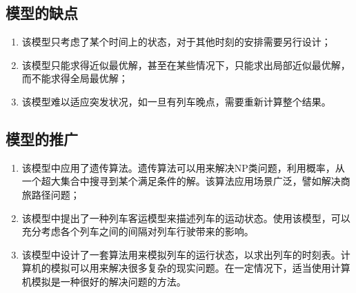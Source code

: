 \subsection{模型的缺点}

\begin{enumerate}
    \item 该模型只考虑了某个时间上的状态，对于其他时刻的安排需要另行设计；
    \item 该模型只能求得近似最优解，甚至在某些情况下，只能求出局部近似最优解，而不能求得全局最优解；
    \item 该模型难以适应突发状况，如一旦有列车晚点，需要重新计算整个结果。
\end{enumerate}

\subsection{模型的推广}

\begin{enumerate}
    \item 该模型中应用了遗传算法。遗传算法可以用来解决NP类问题，利用概率，从一个超大集合中搜寻到某个满足条件的解。该算法应用场景广泛，譬如解决商旅路径问题；
    \item 该模型中提出了一种列车客运模型来描述列车的运动状态。使用该模型，可以充分考虑各个列车之间的间隔对列车行驶带来的影响。
    \item 该模型中设计了一套算法用来模拟列车的运行状态，以求出列车的时刻表。计算机的模拟可以用来解决很多复杂的现实问题。在一定情况下，适当使用计算机模拟是一种很好的解决问题的方法。
\end{enumerate}